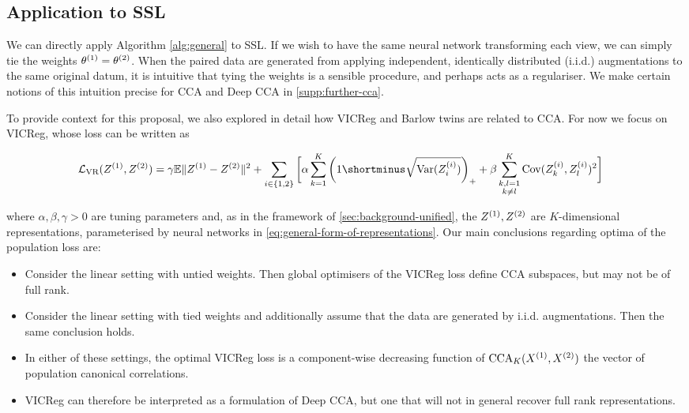 \subsection{Application to SSL}
We can directly apply Algorithm \ref{alg:general} to SSL.
If we wish to have the same neural network transforming each view, we can simply tie the weights $\theta^{(1)} = \theta^{(2)}$.
When the paired data are generated from applying independent, identically distributed (i.i.d.) augmentations to the same original datum, it is intuitive that tying the weights is a sensible procedure, and perhaps acts as a regulariser.
We make certain notions of this intuition precise for CCA and Deep CCA in \cref{supp:further-cca}.

To provide context for this proposal, we also explored in detail how VICReg and Barlow twins are related to CCA.
For now we focus on VICReg, whose loss can be written as
\begin{small}\begin{align*}
                 \mathcal{L}_\text{VR}(Z\sps{1}, Z\sps{2})
                 &= \gamma \mathbb{E} \norm{Z^{(1)} - Z^{(2)}}^2 + \sum_{i \in \{1,2\}} \bigg[\alpha \sum_{k=1}^K \left(1 \shortminus \sqrt{\Var(Z\sps{i}_i)}\right)_+ + \beta \sum_{\substack{k,l=1 \\ k \neq l}}^K \Cov(Z\sps{i}_k,Z\sps{i}_l)^2 \bigg]
\end{align*}\end{small}%
where $\alpha, \beta, \gamma > 0$ are tuning parameters and, as in the framework of \cref{sec:background-unified}, the $Z^{(1)}, Z^{(2)}$ are $K$-dimensional representations, parameterised by neural networks in \cref{eq:general-form-of-representations}.
Our main conclusions regarding optima of the population loss are:
\begin{itemize}
    \item Consider the linear setting with untied weights. Then global optimisers of the VICReg loss define CCA subspaces, but may not be of full rank.
    \item Consider the linear setting with tied weights and additionally assume that the data are generated by i.i.d. augmentations. Then the same conclusion holds.
    \item In either of these settings, the optimal VICReg loss is a component-wise decreasing function of $\operatorname{CCA}_K(X^{(1)}, X^{(2)})$ the vector of population canonical correlations.
    \item VICReg can therefore be interpreted as a formulation of Deep CCA, but one that will not in general recover full rank representations.
\end{itemize}

